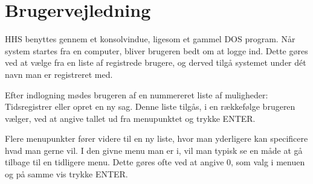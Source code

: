 
\section{Brugervejledning}\label{brugervejledning}

HHS benyttes gennem et konsolvindue, ligesom et gammel DOS program.
Når system startes fra en computer, bliver brugeren bedt om at logge ind.
Dette gøres ved at vælge fra en liste af registrede brugere, og derved tilgå systemet under dét navn man er registreret med.

Efter indlogning mødes brugeren af en nummereret liste af muligheder: Tidsregistrer eller opret en ny sag.
Denne liste tilgås, i en rækkefølge brugeren vælger, ved at angive tallet ud fra menupunktet og trykke ENTER.

Flere menupunkter fører videre til en ny liste, hvor man yderligere kan specificere hvad man gerne vil.
I den givne menu man er i, vil man typisk se en måde at gå tilbage til en tidligere menu.
Dette gøres ofte ved at angive 0, som valg i menuen og på samme vis trykke ENTER.
